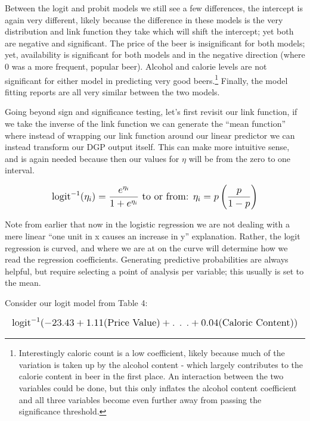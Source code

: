 \documentclass[12pt]{article}\usepackage[]{graphicx}\usepackage[]{color}
\begin{document}
\begin{flushleft}
Between the logit and probit models we still see a few differences, the intercept is again very different, likely because the difference in these models is the very distribution and link function they take which will shift the intercept; yet both are negative and significant. The price of the beer is insignificant for both models; yet, availability is significant for both models and in the negative direction (where 0 was a more frequent, popular beer). Alcohol and calorie levels are not significant for either model in predicting very good beers.\footnote{Interestingly caloric count is a low coefficient, likely because much of the variation is taken up by the alcohol content - which largely contributes to the calorie content in beer in the first place. An interaction between the two variables could be done, but this only inflates the alcohol content coefficient and all three variables become even further away from passing the significance threshold.} Finally, the model fitting reports are all very similar between the two models.

Going beyond sign and significance testing, let's first revisit our link function, if we take the inverse of the link function we can generate the ``mean function'' where instead of wrapping our link function around our linear predictor we can instead transform our DGP output itself. This can make more intuitive sense, and is again needed because then our values for $\eta$ will be from the zero to one interval.

\begin{equation}
\mathlarger{ \text{logit}^{-1} (\eta_i) = \frac{e^{\eta_i}}{1+e^{\eta_i}} \text{ to or from: } \eta_i = p\left( \frac{p}{1-p}\right) }
\end{equation}

Note from earlier that now in the logistic regression we are not dealing with a mere linear ``one unit in x causes an increase in y'' explanation. Rather, the logit regression is curved, and where we are at on the curve will determine how we read the regression coefficients. Generating predictive probabilities are always helpful, but require selecting a point of analysis per variable; this usually is set to the mean.

Consider our logit model from Table 4:

\begin{equation}
\mathlarger{ \text{logit}^{-1}(-23.43 + 1.11(\text{Price Value)} + \text{. . .} + 0.04(\text{Caloric Content))} }
\end{equation}


\end{flushleft}
\end{document}
